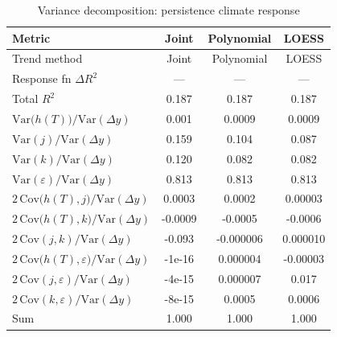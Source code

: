 \begin{table}[htbp]
\centering
\caption{Variance decomposition: persistence climate response}
\label{tab:variance_decomp_persistence}

\small
\begin{tabular}{@{}lccc@{}}
\toprule
Metric & Joint & Polynomial & LOESS \\
\midrule
Trend method & Joint & Polynomial & LOESS \\
\midrule
Response fn $\Delta R^2$ & — & — & — \\
Total $R^2$ & 0.187 & 0.187 & 0.187 \\
\midrule
$\mathrm{Var}\!\big(h(T)\big)/\mathrm{Var}(\Delta y)$ & 0.001 & 0.0009 & 0.0009 \\
$\mathrm{Var}(j)/\mathrm{Var}(\Delta y)$ & 0.159 & 0.104 & 0.087 \\
$\mathrm{Var}(k)/\mathrm{Var}(\Delta y)$ & 0.120 & 0.082 & 0.082 \\
$\mathrm{Var}(\varepsilon)/\mathrm{Var}(\Delta y)$ & 0.813 & 0.813 & 0.813 \\
\midrule
$2\,\mathrm{Cov}\!\big(h(T),j\big)/\mathrm{Var}(\Delta y)$ & 0.0003 & 0.0002 & 0.00003 \\
$2\,\mathrm{Cov}\!\big(h(T),k\big)/\mathrm{Var}(\Delta y)$ & -0.0009 & -0.0005 & -0.0006 \\
$2\,\mathrm{Cov}(j,k)/\mathrm{Var}(\Delta y)$ & -0.093 & -0.000006 & 0.000010 \\
$2\,\mathrm{Cov}\!\big(h(T),\varepsilon\big)/\mathrm{Var}(\Delta y)$ & -1e-16 & 0.000004 & -0.00003 \\
$2\,\mathrm{Cov}(j,\varepsilon)/\mathrm{Var}(\Delta y)$ & -4e-15 & 0.000007 & 0.017 \\
$2\,\mathrm{Cov}(k,\varepsilon)/\mathrm{Var}(\Delta y)$ & -8e-15 & 0.0005 & 0.0006 \\
\midrule
Sum & 1.000 & 1.000 & 1.000 \\
\bottomrule
\end{tabular}
\end{table}